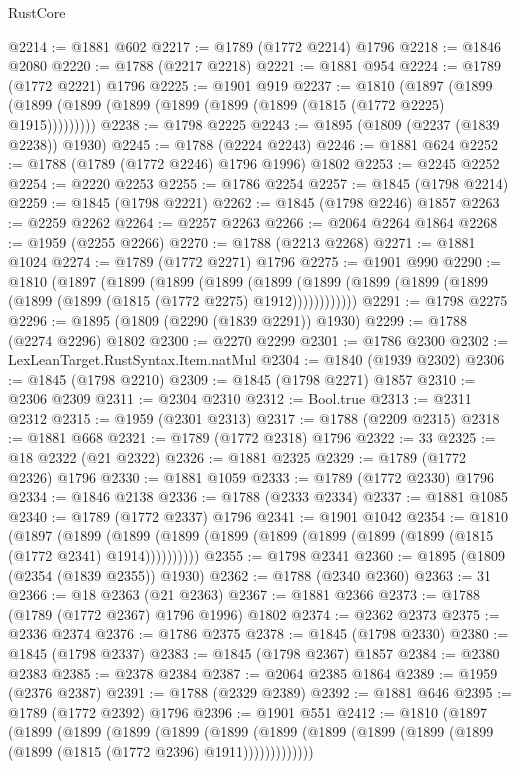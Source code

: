 \begin{lexlean}{RustCore}
\begin{coremodule}
@2214 := @1881 @602
@2217 := @1789 (@1772 @2214) @1796
@2218 := @1846 @2080
@2220 := @1788 (@2217 @2218)
@2221 := @1881 @954
@2224 := @1789 (@1772 @2221) @1796
@2225 := @1901 @919
@2237 := @1810
    (@1897 (@1899 (@1899 (@1899 (@1899 (@1899 (@1899 (@1899 (@1815 (@1772 @2225) @1915)))))))))
@2238 := @1798 @2225
@2243 := @1895 (@1809 (@2237 (@1839 @2238)) @1930)
@2245 := @1788 (@2224 @2243)
@2246 := @1881 @624
@2252 := @1788 (@1789 (@1772 @2246) @1796 @1996) @1802
@2253 := @2245 @2252
@2254 := @2220 @2253
@2255 := @1786 @2254
@2257 := @1845 (@1798 @2214)
@2259 := @1845 (@1798 @2221)
@2262 := @1845 (@1798 @2246) @1857
@2263 := @2259 @2262
@2264 := @2257 @2263
@2266 := @2064 @2264 @1864
@2268 := @1959 (@2255 @2266)
@2270 := @1788 (@2213 @2268)
@2271 := @1881 @1024
@2274 := @1789 (@1772 @2271) @1796
@2275 := @1901 @990
@2290 := @1810
    (@1897
      (@1899
        (@1899
          (@1899
            (@1899 (@1899 (@1899 (@1899 (@1899 (@1899 (@1899 (@1815 (@1772 @2275) @1912))))))))))))
@2291 := @1798 @2275
@2296 := @1895 (@1809 (@2290 (@1839 @2291)) @1930)
@2299 := @1788 (@2274 @2296) @1802
@2300 := @2270 @2299
@2301 := @1786 @2300
@2302 := LexLeanTarget.RustSyntax.Item.natMul
@2304 := @1840 (@1939 @2302)
@2306 := @1845 (@1798 @2210)
@2309 := @1845 (@1798 @2271) @1857
@2310 := @2306 @2309
@2311 := @2304 @2310
@2312 := Bool.true
@2313 := @2311 @2312
@2315 := @1959 (@2301 @2313)
@2317 := @1788 (@2209 @2315)
@2318 := @1881 @668
@2321 := @1789 (@1772 @2318) @1796
@2322 := 33
@2325 := @18 @2322 (@21 @2322)
@2326 := @1881 @2325
@2329 := @1789 (@1772 @2326) @1796
@2330 := @1881 @1059
@2333 := @1789 (@1772 @2330) @1796
@2334 := @1846 @2138
@2336 := @1788 (@2333 @2334)
@2337 := @1881 @1085
@2340 := @1789 (@1772 @2337) @1796
@2341 := @1901 @1042
@2354 := @1810
    (@1897
      (@1899 (@1899 (@1899 (@1899 (@1899 (@1899 (@1899 (@1899 (@1815 (@1772 @2341) @1914))))))))))
@2355 := @1798 @2341
@2360 := @1895 (@1809 (@2354 (@1839 @2355)) @1930)
@2362 := @1788 (@2340 @2360)
@2363 := 31
@2366 := @18 @2363 (@21 @2363)
@2367 := @1881 @2366
@2373 := @1788 (@1789 (@1772 @2367) @1796 @1996) @1802
@2374 := @2362 @2373
@2375 := @2336 @2374
@2376 := @1786 @2375
@2378 := @1845 (@1798 @2330)
@2380 := @1845 (@1798 @2337)
@2383 := @1845 (@1798 @2367) @1857
@2384 := @2380 @2383
@2385 := @2378 @2384
@2387 := @2064 @2385 @1864
@2389 := @1959 (@2376 @2387)
@2391 := @1788 (@2329 @2389)
@2392 := @1881 @646
@2395 := @1789 (@1772 @2392) @1796
@2396 := @1901 @551
@2412 := @1810
    (@1897
      (@1899
        (@1899
          (@1899
            (@1899
              (@1899
                (@1899 (@1899 (@1899 (@1899 (@1899 (@1899 (@1815 (@1772 @2396) @1911)))))))))))))

\end{coremodule}
\end{lexlean}

